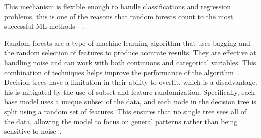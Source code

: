 This mechanism is flexible enough to handle classifications and regression problems,
this is one of the reasons that random forests count to the most successful \ac{ML}
methods~\cite[p.
3-4]{biau_randomforestguided_2016}~\cite[p. 25]{breiman_randomforests_2001}.

%
%
Random forests are a type of machine learning algorithm that uses bagging and the
random selection of features to produce accurate results.
They are effective at handling noise and can work with both continuous and categorical
variables.
This combination of techniques helps improve the performance of the algorithm~\cite[p.
259]{liu_newmachinelearning_2012}.
Decision trees have a limitation in their ability to overfit, which is a
disadvantage.
his is mitigated by the use of subset and feature randomization.
Specifically, each base model uses a unique subset of the data, and each node in
the decision tree is split using a random set of features.
This ensures that no single tree sees all of the data, allowing the model to focus on
general patterns rather than being sensitive to noise~\cite[p. 259]{
    liu_newmachinelearning_2012}.


%



%
%


